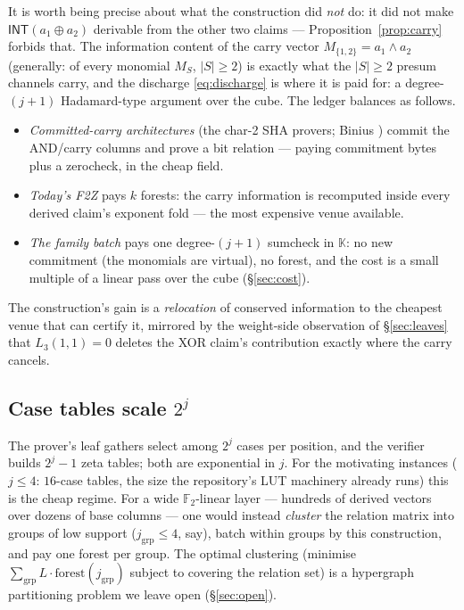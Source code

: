 \documentclass[11pt]{article}
\newcommand{\F}{\mathbb{F}}
\newcommand{\K}{\mathbb{K}}            %
\newcommand{\Ftwo}{\F_2}
\newcommand{\INT}{\mathsf{INT}}
\theoremstyle{plain}
\theoremstyle{definition}
\theoremstyle{remark}
\begin{document}
It is worth being precise about what the construction did \emph{not} do: it
did not make $\INT(a_1\oplus a_2)$ derivable from the other two claims ---
Proposition~\ref{prop:carry} forbids that. The information content of the
carry vector $M_{\{1,2\}}=a_1\wedge a_2$ (generally: of every monomial
$M_S$, $|S|\ge2$) is exactly what the $|S|\ge 2$ presum channels carry, and
the discharge \eqref{eq:discharge} is where it is paid for: a degree-$(j+1)$
Hadamard-type argument over the cube. The ledger balances as follows.
\begin{itemize}[leftmargin=1.6em,itemsep=1pt]
\item \emph{Committed-carry architectures} (the char-2 SHA provers; Binius
  \cite{Binius}) commit the AND/carry columns and prove a bit relation ---
  paying commitment bytes plus a zerocheck, in the cheap field.
\item \emph{Today's F2Z} pays $k$ forests: the carry information is
  recomputed inside every derived claim's exponent fold --- the most
  expensive venue available.
\item \emph{The family batch} pays one degree-$(j{+}1)$ sumcheck in $\K$:
  no new commitment (the monomials are virtual), no forest, and the cost is
  a small multiple of a linear pass over the cube (\S\ref{sec:cost}).
\end{itemize}
The construction's gain is a \emph{relocation} of conserved information to
the cheapest venue that can certify it, mirrored by the weight-side
observation of \S\ref{sec:leaves} that $L_3(1,1)=0$ deletes the XOR claim's
contribution exactly where the carry cancels.

\subsection{Case tables scale \texorpdfstring{$2^{j}$}{2\^{}j}}\label{sec:scaling}

The prover's leaf gathers select among $2^{j}$ cases per position, and the
verifier builds $2^{j}-1$ zeta tables; both are exponential in $j$. For the
motivating instances ($j\le 4$: $16$-case tables, the size the repository's
LUT machinery already runs) this is the cheap regime. For a wide
$\Ftwo$-linear layer --- hundreds of derived vectors over dozens of base
columns --- one would instead \emph{cluster} the relation matrix into groups
of low support ($j_{\mathrm{grp}}\le 4$, say), batch within groups by this
construction, and pay one forest per group. The optimal clustering (minimise
$\sum_{\mathrm{grp}}L\cdot\mathrm{forest}(j_{\mathrm{grp}})$ subject to
covering the relation set) is a hypergraph partitioning problem we leave
open (\S\ref{sec:open}).
\end{document}
